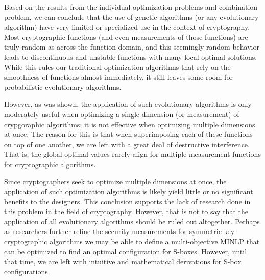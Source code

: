 \documentclass[11pt]{article}
\begin{document}
Based on the results from the individual optimization problems and combination problem, we can conclude that the use of genetic algorithms (or any evolutionary algorithm) have very limited or specialized use in the context of cryptography. Most cryptographic functions (and even measurements of those functions) are truly random as across the function domain, and this seemingly random behavior leads to discontinuous and unstable functions with many local optimal solutions. While this rules our traditional optimization algorithms that rely on the smoothness of functions almost immediately, it still leaves some room for probabilistic evolutionary algorithms. 

However, as was shown, the application of such evolutionary algorithms is only moderately useful when optimizing a single dimension (or measurement) of crypgoraphic algorithms; it is not effective when optimizing multiple dimensions at once. The reason for this is that when superimposing each of these functions on top of one another, we are left with a great deal of destructive interference. That is, the global optimal values rarely align for multiple measurement functions for cryptographic algorithms. 

Since cryptographers seek to optimize multiple dimensions at once, the application of such optimization algorithms is likely yield little or no significant benefits to the designers. This conclusion supports the lack of research done in this problem in the field of cryptography. However, that is not to say that the application of all evolutionary algorithms should be ruled out altogether. Perhaps as researchers further refine the security measurements for symmetric-key cryptographic algorithms we may be able to define a multi-objective MINLP that can be optimized to find an optimal configuration for S-boxes. However, until that time, we are left with intuitive and mathematical derivations for S-box configurations.



\end{document}
